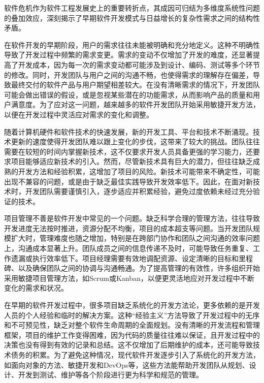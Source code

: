 
软件危机作为软件工程发展史上的重要转折点，其成因可归结为多维度系统性问题的叠加效应，深刻揭示了早期软件开发模式与日益增长的复杂性需求之间的结构性矛盾。

在软件开发的早期阶段，用户的需求往往未能被明确和充分地定义。这种不明确性导致了开发过程中频繁的需求变更。需求的变动不仅增加了开发的难度，还显著提高了开发成本，因为每一次的需求变动都可能涉及到设计、编码、测试等多个环节的修改。同时，开发团队与用户之间的沟通不畅，也使得需求的理解存在偏差，导致最终交付的软件产品与用户期望相差较大。在没有清晰需求的情况下，开发团队可能会做出错误的假设，或是忽视某些潜在的功能需求，从而影响产品的质量和用户满意度。为了应对这一问题，越来越多的软件开发团队开始采用敏捷开发方法，以便在开发过程中灵活应对需求的变化和调整。

随着计算机硬件和软件技术的快速发展，新的开发工具、平台和技术不断涌现。技术更新的速度使得开发团队难以跟上变化的步伐，这带来了较大的挑战。团队往往需要在较短的时间内掌握新技术，这不仅要求开发人员具备更强的学习能力，还要求项目能够适应新技术的引入。然而，尽管新技术具有巨大的潜力，但往往缺乏成熟的开发方法和经验积累，这增加了项目的风险。新技术可能带来不确定性，可能出现不兼容的问题，或是由于缺乏最佳实践导致开发效率低下。因此，在面对新技术时，开发团队需要谨慎引入，逐步适应并积累经验，避免过度依赖未经过充分验证的技术。

项目管理不善是软件开发中常见的一个问题。缺乏科学合理的管理方法，往往导致开发进度无法按时推进，资源分配不均衡，项目的成本超支等问题。当开发团队规模扩大时，管理难度也随之增加，特别是在跨部门协作和团队之间沟通的效率问题上，沟通成本显著上升。团队成员之间的信息传递不及时，可能导致任务重复、工作遗漏或执行效率低下。项目经理需要有效地调配资源、设定清晰的目标和里程碑、以及确保团队之间的协调与沟通畅通。为了提高管理的有效性，许多组织开始采用敏捷项目管理方法，如Scrum或Kanban，以便更灵活地应对开发过程中不断变化的需求和状况。

在早期的软件开发过程中，很多项目缺乏系统化的开发方法论，更多依赖的是开发人员的个人经验和临时的解决方案。这种``经验主义''方法导致了开发过程中的无序和不可预见性，缺乏对整个软件生命周期的全面规划。没有清晰的开发流程和管理框架，项目的维护工作变得困难，因为代码的质量往往难以保证，且开发过程中的决策也没有得到有效的记录和总结。这不仅增加了后期维护的成本，还可能导致技术债务的积累。为了避免这种情况，现代软件开发逐步引入了系统化的开发方法，如面向对象的方法、敏捷开发和DevOps等，这些方法能帮助开发团队从规划、设计、开发到测试、维护等各个阶段进行更为科学和规范的管理。

